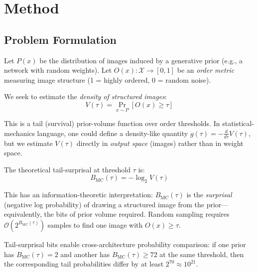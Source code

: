 \documentclass{article}
\begin{document}
\section{Method}
\label{sec:method}


\subsection{Problem Formulation}

Let $P(x)$ be the distribution of images induced by a generative prior (e.g., a network with random weights). Let $O(x): \mathcal{X} \to [0,1]$ be an \emph{order metric} measuring image structure (1 = highly ordered, 0 = random noise).

We seek to estimate the \emph{density of structured images}:
\begin{equation}
    V(\tau) = \Pr_{x \sim P}[O(x) \geq \tau]
\end{equation}

This is a tail (survival) prior-volume function over order thresholds. In statistical-mechanics language, one could define a density-like quantity $g(\tau)=-\frac{d}{d\tau}V(\tau)$, but we estimate $V(\tau)$ directly in \emph{output space} (images) rather than in weight space.

The theoretical tail-surprisal at threshold $\tau$ is:
\begin{equation}
    B_{\text{MC}}(\tau) = -\log_2 V(\tau)
\end{equation}

This has an information-theoretic interpretation: $B_{\text{MC}}(\tau)$ is the \emph{surprisal} (negative log probability) of drawing a structured image from the prior---equivalently, the bits of prior volume required. Random sampling requires $\mathcal{O}(2^{B_{\text{MC}}(\tau)})$ samples to find one image with $O(x) \geq \tau$.

Tail-surprisal bits enable cross-architecture probability comparison: if one prior has $B_{\text{MC}}(\tau)=2$ and another has $B_{\text{MC}}(\tau)\ge72$ at the same threshold, then the corresponding tail probabilities differ by at least $2^{70} \approx 10^{21}$.
\end{document}
